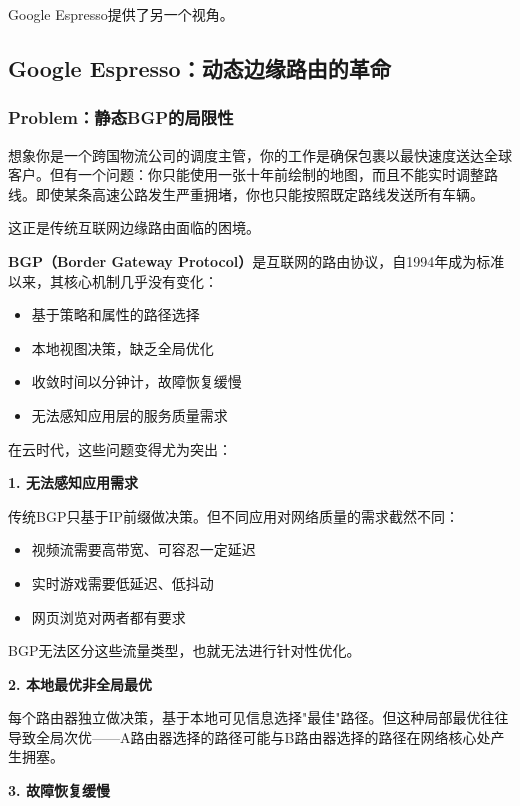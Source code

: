Google Espresso提供了另一个视角。

\subsection{Google Espresso：动态边缘路由的革命}

\subsubsection{Problem：静态BGP的局限性}

想象你是一个跨国物流公司的调度主管，你的工作是确保包裹以最快速度送达全球客户。但有一个问题：你只能使用一张十年前绘制的地图，而且不能实时调整路线。即使某条高速公路发生严重拥堵，你也只能按照既定路线发送所有车辆。

这正是传统互联网边缘路由面临的困境。

\textbf{BGP（Border Gateway Protocol）}是互联网的路由协议，自1994年成为标准以来，其核心机制几乎没有变化：
\begin{itemize}
    \item 基于策略和属性的路径选择
    \item 本地视图决策，缺乏全局优化
    \item 收敛时间以分钟计，故障恢复缓慢
    \item 无法感知应用层的服务质量需求
\end{itemize}

在云时代，这些问题变得尤为突出：

\textbf{1. 无法感知应用需求}

传统BGP只基于IP前缀做决策。但不同应用对网络质量的需求截然不同：
\begin{itemize}
    \item 视频流需要高带宽、可容忍一定延迟
    \item 实时游戏需要低延迟、低抖动
    \item 网页浏览对两者都有要求
\end{itemize}

BGP无法区分这些流量类型，也就无法进行针对性优化。

\textbf{2. 本地最优非全局最优}

每个路由器独立做决策，基于本地可见信息选择"最佳"路径。但这种局部最优往往导致全局次优——A路由器选择的路径可能与B路由器选择的路径在网络核心处产生拥塞。

\textbf{3. 故障恢复缓慢}

